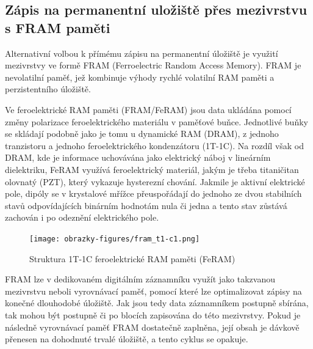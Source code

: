 \subsection{Zápis na permanentní uložiště přes mezivrstvu s FRAM paměti}
Alternativní volbou k přímému zápisu na permanentní úložiště je využití mezivrstvy ve formě FRAM (Ferroelectric Random Access Memory). FRAM je nevolatilní paměť, jež kombinuje výhody rychlé volatilní RAM paměti a perzistentního úložiště.

Ve feroelektrické RAM paměti (FRAM/FeRAM) jsou data ukládána pomocí změny polarizace feroelektrického materiálu v paměťové buňce. Jednotlivé buňky se skládají podobně jako je tomu u dynamické RAM (DRAM), z jednoho tranzistoru a jednoho feroelektrického kondenzátoru (1T-1C). Na rozdíl však od DRAM, kde je informace uchovávána jako elektrický náboj v lineárním dielektriku, FeRAM využívá feroelektrický materiál, jakým je třeba titaničitan olovnatý (PZT), který vykazuje hysterezní chování. Jakmile je aktivní elektrické pole, dipóly se v krystalové mřížce přeuspořádají do jednoho ze dvou stabilních stavů odpovídajících binárním hodnotám nula či jedna a tento stav zůstává zachován i po odeznění elektrického pole. \cite{ieee_feram_ultra_high_density_embedded_mem}

\begin{figure}[h]
    \centering
    \texttt{[image: obrazky-figures/fram\_t1-c1.png]}
    
    \caption{Struktura 1T-1C feroelektrické RAM paměti (FeRAM) \cite{researchgate_nonvolatile_memory_technologies}}
    \label{fig:feram-1t-1c}
\end{figure}

FRAM lze v dedikovaném digitálním záznamníku využít jako takzvanou mezivrstvu neboli vyrovnávací paměť, pomocí které lze optimalizovat zápisy na konečné dlouhodobé úložiště. Jak jsou tedy data záznamníkem postupně sbírána, tak mohou být postupně či po blocích zapisována do této mezivrstvy. Pokud je následně vyrovnávací paměť FRAM dostatečně zaplněna, její obsah je dávkově přenesen na dohodnuté trvalé úložiště, a tento cyklus se opakuje. 


